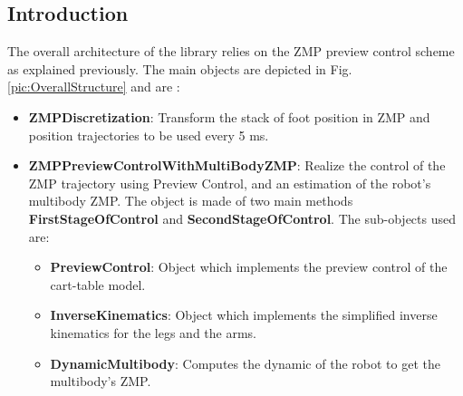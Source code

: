 \subsection{Introduction}
The overall architecture of the library relies on the ZMP preview control scheme as explained previously.
The main objects are depicted in Fig. \ref{pic:OverallStructure} and are :
\begin{itemize}
\item {\bf ZMPDiscretization}: Transform the stack of foot position in ZMP and position trajectories to be used
every 5 ms.
\item {\bf ZMPPreviewControlWithMultiBodyZMP}: Realize the control of the ZMP trajectory using Preview Control, and
an estimation of the robot's multibody ZMP. The object is made of two main methods {\bf FirstStageOfControl} and {\bf SecondStageOfControl}.
The sub-objects used are:
\begin{itemize}
\item {\bf PreviewControl}: Object which implements the preview control of the cart-table model.
\item {\bf InverseKinematics}: Object which implements the simplified inverse kinematics for the legs and the arms.
\item {\bf DynamicMultibody}: Computes the dynamic of the robot to get the multibody's ZMP.
\end{itemize}
\end{itemize}

